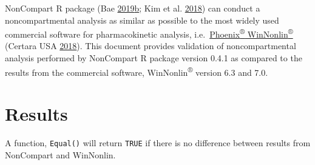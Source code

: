 \documentclass[12pt,]{krantz}
\begin{document}
NonCompart R package (Bae \protect\hyperlink{ref-R-NonCompart}{2019}\protect\hyperlink{ref-R-NonCompart}{b}; Kim et al. \protect\hyperlink{ref-Kim_2018}{2018}) can conduct a noncompartmental analysis as similar as possible to the most widely used commercial software for pharmacokinetic analysis, i.e.~\href{https://www.certara.com/software/pkpd-modeling-and-simulation/phoenix-winnonlin/}{Phoenix\textsuperscript{®} WinNonlin\textsuperscript{®}} (Certara USA \protect\hyperlink{ref-wnl}{2018}).
This document provides validation of noncompartmental analysis performed by NonCompart R package version 0.4.1 as compared to the results from the commercial software, WinNonlin\textsuperscript{®} version 6.3 and 7.0.

\hypertarget{results}{%
\section{Results}\label{results}}

A function, \texttt{Equal()} will return \texttt{TRUE} if there is no difference between results from NonCompart and WinNonlin.
\end{document}
